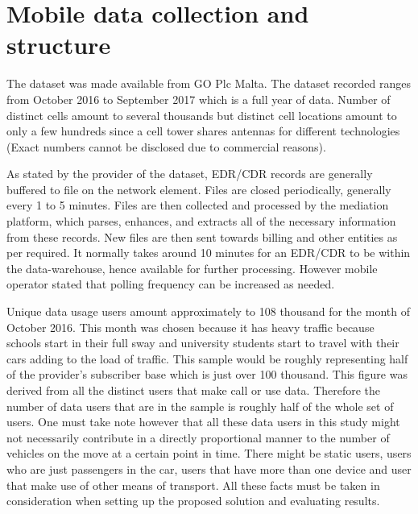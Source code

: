 \documentclass[12pt, a4paper]{report}
\theoremstyle{definition}
\theoremstyle{definition}%
\theoremstyle{definition}%
\theoremstyle{definition}%
\theoremstyle{definition}%
\theoremstyle{definition}%
\begin{document}
\section{Mobile data collection and structure}

The dataset was made available from GO Plc Malta. The dataset recorded ranges from October 2016 to September 2017 which is a full year of data. Number of distinct cells amount to several thousands but distinct cell locations amount to only a few hundreds since a cell tower shares antennas for different technologies (Exact numbers cannot be disclosed due to commercial reasons).

As stated by the provider of the dataset, EDR/CDR records are generally buffered to file on the network element. Files are closed periodically, generally every 1 to 5 minutes. Files are then collected and processed by the mediation platform, which parses, enhances, and extracts all of the necessary information from these records. New files are then sent towards billing and other entities as per required. It normally takes around 10 minutes for an EDR/CDR to be within the data-warehouse, hence available for further processing. However mobile operator stated that polling frequency can be increased as needed.

Unique data usage users amount approximately to 108 thousand for the month of October 2016. This month was chosen because it has heavy traffic because schools start in their full sway and university students start to travel with their cars adding to the load of traffic. This sample would be roughly representing half of the provider's subscriber base which is just over 100 thousand. This figure was derived from all the distinct users that make call or use data. Therefore the number of data users that are in the sample is roughly half of the whole set of users. One must take note however that all these data users in this study might not necessarily contribute in a directly proportional manner to the number of vehicles on the move at a certain point in time. There might be static users, users who are just passengers in the car, users that have more than one device and user that make use of other means of transport. All these facts must be taken in consideration when setting up the proposed solution and evaluating results.

\end{document}
